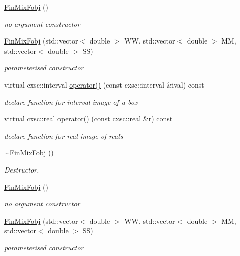 \begin{DoxyCompactItemize}
\item 
\hyperlink{classFinMixFobj_ac40f8697f1d85f0db7d36b6dabfab2c7}{\-Fin\-Mix\-Fobj} ()
\begin{DoxyCompactList}\small\item\em no argument constructor \end{DoxyCompactList}\item 
\hyperlink{classFinMixFobj_aed59e9fe54feddd97f4410b63eed88ec}{\-Fin\-Mix\-Fobj} (std\-::vector$<$ double $>$ \-W\-W, std\-::vector$<$ double $>$ \-M\-M, std\-::vector$<$ double $>$ \-S\-S)
\begin{DoxyCompactList}\small\item\em parameterised constructor \end{DoxyCompactList}\item 
virtual cxsc\-::interval \hyperlink{classFinMixFobj_a4361fc02de341dabfb65f38aad074519}{operator()} (const cxsc\-::interval \&ival) const 
\begin{DoxyCompactList}\small\item\em declare function for interval image of a box \end{DoxyCompactList}\item 
virtual cxsc\-::real \hyperlink{classFinMixFobj_abf3f0eb0845a534cf096926968f6746f}{operator()} (const cxsc\-::real \&r) const 
\begin{DoxyCompactList}\small\item\em declare function for real image of reals \end{DoxyCompactList}\item 
\hyperlink{classFinMixFobj_ab096a0e3d2acdd824aee0a5034b099f2}{$\sim$\-Fin\-Mix\-Fobj} ()
\begin{DoxyCompactList}\small\item\em \-Destructor. \end{DoxyCompactList}\item 
\hyperlink{classFinMixFobj_ac40f8697f1d85f0db7d36b6dabfab2c7}{\-Fin\-Mix\-Fobj} ()
\begin{DoxyCompactList}\small\item\em no argument constructor \end{DoxyCompactList}\item 
\hyperlink{classFinMixFobj_aed59e9fe54feddd97f4410b63eed88ec}{\-Fin\-Mix\-Fobj} (std\-::vector$<$ double $>$ \-W\-W, std\-::vector$<$ double $>$ \-M\-M, std\-::vector$<$ double $>$ \-S\-S)
\begin{DoxyCompactList}\small\item\em parameterised constructor \end{DoxyCompactList}\item 

\end{DoxyCompactItemize}
